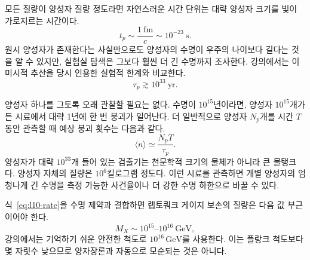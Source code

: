 
\begin{classroomqa}
\end{classroomqa}

모든 질량이 양성자 질량 정도라면 자연스러운 시간 단위는 대략 양성자 크기를 빛이 가로지르는 시간이다.
\begin{equation}
t_p\sim\frac{1\ \mathrm{fm}}{c}\sim10^{-23}\ \mathrm{s}.
\label{eq:l10-proton-time}
\end{equation}
원시 양성자가 존재한다는 사실만으로도 양성자의 수명이 우주의 나이보다 길다는 것을 알 수 있지만, 실험실 탐색은 그보다 훨씬 더 긴 수명까지 조사한다. 강의에서는 이 미시적 추산을 당시 인용한 실험적 한계와 비교한다.
\begin{equation}
\tau_p\gtrsim10^{33}\ \mathrm{yr}.
\label{eq:l10-lifetime-bound}
\end{equation}

양성자 하나를 그토록 오래 관찰할 필요는 없다. 수명이 \(10^{15}\)년이라면, 양성자 \(10^{15}\)개가 든 시료에서 대략 1년에 한 번 붕괴가 일어난다. 더 일반적으로 양성자 \(N_p\)개를 시간 \(T\) 동안 관측할 때 예상 붕괴 횟수는 다음과 같다.
\begin{equation}
\langle n\rangle\simeq\frac{N_pT}{\tau_p}.
\label{eq:l10-event-count}
\end{equation}
양성자가 대략 \(10^{33}\)개 들어 있는 검출기는 천문학적 크기의 물체가 아니라 큰 물탱크다. 양성자 자체의 질량은 \(10^6\)킬로그램 정도다. 이런 시료를 관측하면 개별 양성자의 엄청나게 긴 수명을 측정 가능한 사건율이나 더 강한 수명 하한으로 바꿀 수 있다.

식~\eqref{eq:l10-rate}을 수명 제약과 결합하면 렙토쿼크 게이지 보손의 질량은 다음 값 부근이어야 한다.
\begin{equation}
M_X\sim10^{15}\text{--}10^{16}\ \mathrm{GeV},
\label{eq:l10-mx}
\end{equation}
강의에서는 기억하기 쉬운 안전한 척도로 \(10^{16}\,\mathrm{GeV}\)를 사용한다. 이는 플랑크 척도보다 몇 자릿수 낮으므로 양자장론과 자동으로 모순되는 것은 아니다.


